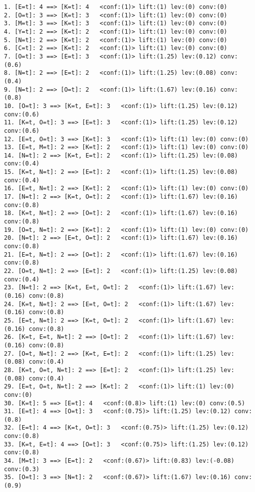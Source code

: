 \documentclass[12pt]{elsart}
\begin{document}
\begin{verbatim}
1. [E=t]: 4 ==> [K=t]: 4   <conf:(1)> lift:(1) lev:(0) conv:(0) 
2. [O=t]: 3 ==> [K=t]: 3   <conf:(1)> lift:(1) lev:(0) conv:(0) 
3. [M=t]: 3 ==> [K=t]: 3   <conf:(1)> lift:(1) lev:(0) conv:(0) 
4. [Y=t]: 2 ==> [K=t]: 2   <conf:(1)> lift:(1) lev:(0) conv:(0) 
5. [N=t]: 2 ==> [K=t]: 2   <conf:(1)> lift:(1) lev:(0) conv:(0) 
6. [C=t]: 2 ==> [K=t]: 2   <conf:(1)> lift:(1) lev:(0) conv:(0) 
7. [O=t]: 3 ==> [E=t]: 3   <conf:(1)> lift:(1.25) lev:(0.12) conv:(0.6) 
8. [N=t]: 2 ==> [E=t]: 2   <conf:(1)> lift:(1.25) lev:(0.08) conv:(0.4) 
9. [N=t]: 2 ==> [O=t]: 2   <conf:(1)> lift:(1.67) lev:(0.16) conv:(0.8) 
10. [O=t]: 3 ==> [K=t, E=t]: 3   <conf:(1)> lift:(1.25) lev:(0.12) conv:(0.6) 
11. [K=t, O=t]: 3 ==> [E=t]: 3   <conf:(1)> lift:(1.25) lev:(0.12) conv:(0.6) 
12. [E=t, O=t]: 3 ==> [K=t]: 3   <conf:(1)> lift:(1) lev:(0) conv:(0) 
13. [E=t, M=t]: 2 ==> [K=t]: 2   <conf:(1)> lift:(1) lev:(0) conv:(0) 
14. [N=t]: 2 ==> [K=t, E=t]: 2   <conf:(1)> lift:(1.25) lev:(0.08) conv:(0.4) 
15. [K=t, N=t]: 2 ==> [E=t]: 2   <conf:(1)> lift:(1.25) lev:(0.08) conv:(0.4) 
16. [E=t, N=t]: 2 ==> [K=t]: 2   <conf:(1)> lift:(1) lev:(0) conv:(0) 
17. [N=t]: 2 ==> [K=t, O=t]: 2   <conf:(1)> lift:(1.67) lev:(0.16) conv:(0.8) 
18. [K=t, N=t]: 2 ==> [O=t]: 2   <conf:(1)> lift:(1.67) lev:(0.16) conv:(0.8) 
19. [O=t, N=t]: 2 ==> [K=t]: 2   <conf:(1)> lift:(1) lev:(0) conv:(0) 
20. [N=t]: 2 ==> [E=t, O=t]: 2   <conf:(1)> lift:(1.67) lev:(0.16) conv:(0.8) 
21. [E=t, N=t]: 2 ==> [O=t]: 2   <conf:(1)> lift:(1.67) lev:(0.16) conv:(0.8) 
22. [O=t, N=t]: 2 ==> [E=t]: 2   <conf:(1)> lift:(1.25) lev:(0.08) conv:(0.4) 
23. [N=t]: 2 ==> [K=t, E=t, O=t]: 2   <conf:(1)> lift:(1.67) lev:(0.16) conv:(0.8) 
24. [K=t, N=t]: 2 ==> [E=t, O=t]: 2   <conf:(1)> lift:(1.67) lev:(0.16) conv:(0.8) 
25. [E=t, N=t]: 2 ==> [K=t, O=t]: 2   <conf:(1)> lift:(1.67) lev:(0.16) conv:(0.8) 
26. [K=t, E=t, N=t]: 2 ==> [O=t]: 2   <conf:(1)> lift:(1.67) lev:(0.16) conv:(0.8) 
27. [O=t, N=t]: 2 ==> [K=t, E=t]: 2   <conf:(1)> lift:(1.25) lev:(0.08) conv:(0.4) 
28. [K=t, O=t, N=t]: 2 ==> [E=t]: 2   <conf:(1)> lift:(1.25) lev:(0.08) conv:(0.4) 
29. [E=t, O=t, N=t]: 2 ==> [K=t]: 2   <conf:(1)> lift:(1) lev:(0) conv:(0) 
30. [K=t]: 5 ==> [E=t]: 4   <conf:(0.8)> lift:(1) lev:(0) conv:(0.5) 
31. [E=t]: 4 ==> [O=t]: 3   <conf:(0.75)> lift:(1.25) lev:(0.12) conv:(0.8) 
32. [E=t]: 4 ==> [K=t, O=t]: 3   <conf:(0.75)> lift:(1.25) lev:(0.12) conv:(0.8) 
33. [K=t, E=t]: 4 ==> [O=t]: 3   <conf:(0.75)> lift:(1.25) lev:(0.12) conv:(0.8) 
34. [M=t]: 3 ==> [E=t]: 2   <conf:(0.67)> lift:(0.83) lev:(-0.08) conv:(0.3) 
35. [O=t]: 3 ==> [N=t]: 2   <conf:(0.67)> lift:(1.67) lev:(0.16) conv:(0.9) 

\end{verbatim}
\end{document}
